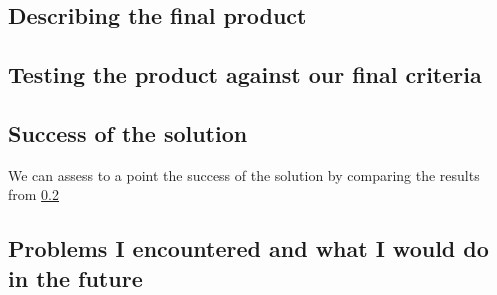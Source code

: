 \documentclass[9pt]{article}
\begin{document}
\newpage
\subsection{Describing the final product}


\newpage
\subsection{Testing the product against our final criteria}\label{ssc_testingFinal}




\newpage
\subsection{Success of the solution}
We can assess to a point the success of the solution by comparing the results from \ref{ssc_testingFinal}



\newpage
\subsection{Problems I encountered and what I would do in the future}











\newpage
{}


\newpage
\listoffigures
\end{document}
